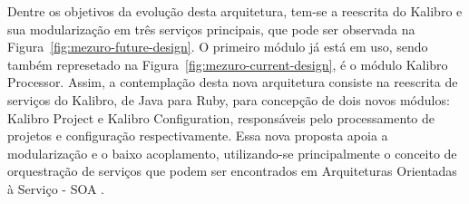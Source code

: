 Dentre os objetivos da evolução desta arquitetura, tem-se a reescrita do Kalibro e sua modularização em três serviços principais, que pode ser observada na Figura~\ref{fig:mezuro-future-design}.
%
O primeiro módulo já está em uso, sendo também represetado na Figura~\ref{fig:mezuro-current-design}, é o módulo Kalibro Processor.
%
Assim, a contemplação desta nova arquitetura consiste na reescrita de serviços do Kalibro, de Java para Ruby, para concepção de dois novos módulos: Kalibro Project e Kalibro Configuration, responsáveis pelo processamento de projetos e configuração respectivamente.
%
Essa nova proposta apoia a modularização e o baixo acoplamento, utilizando-se principalmente o conceito de orquestração de serviços que podem ser encontrados em Arquiteturas Orientadas à Serviço - SOA \cite{thomaserl2007}.





